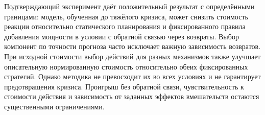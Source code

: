 Подтверждающий эксперимент даёт положительный результат с определёнными границами: модель, обученная до тяжёлого кризиса, может снизить стоимость реакции относительно статического планирования и фиксированного правила добавления мощности в условии с обратной связью через возвраты. Выбор компонент по точности прогноза часто исключает важную зависимость возвратов. При исходной стоимости выбор действий для разных механизмов также улучшает описательную нормированную стоимость относительно обеих фиксированных стратегий. Однако методика не превосходит их во всех условиях и не гарантирует предотвращения кризиса. Проигрыш без обратной связи, чувствительность к стоимости действия и зависимость от заданных эффектов вмешательств остаются существенными ограничениями.
